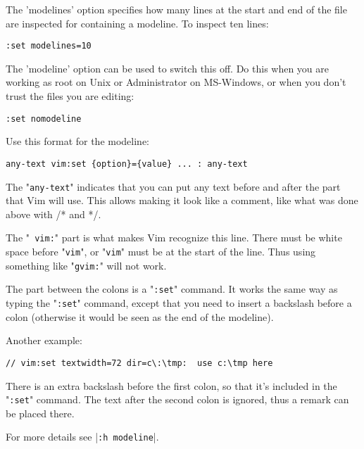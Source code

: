 The 'modelines' option specifies how many lines at the start and end of the file are inspected for containing a modeline.
To inspect ten lines:

\begin{Verbatim}[samepage=true]
 :set modelines=10
\end{Verbatim}

The 'modeline' option can be used to switch this off.
Do this when you are working as root on Unix or Administrator on MS-Windows, or when you don't trust the files you are editing:

\begin{Verbatim}[samepage=true]
 :set nomodeline
\end{Verbatim}

Use this format for the modeline:

\begin{Verbatim}[samepage=true]
    any-text vim:set {option}={value} ... : any-text 
\end{Verbatim}

The "\verb!any-text!" indicates that you can put any text before and after the part that Vim will use.
This allows making it look like a comment, like what was done above with /* and */.

The "\verb! vim:!" part is what makes Vim recognize this line.
There must be white space before "\verb!vim!", or "\verb!vim!" must be at the start of the line.
Thus using something like "\verb!gvim:!" will not work.

The part between the colons is a "\verb!:set!" command.
It works the same way as typing the "\verb!:set!" command, except that you need to insert a backslash before a colon (otherwise it would be seen as the end of the modeline).

Another example:

\begin{Verbatim}[samepage=true]
    // vim:set textwidth=72 dir=c\:\tmp:  use c:\tmp here 
\end{Verbatim}

There is an extra backslash before the first colon, so that it's included in the "\verb!:set!" command.
The text after the second colon is ignored, thus a remark can be placed there.

For more details see |\verb!:h modeline!|.
\clearpage
